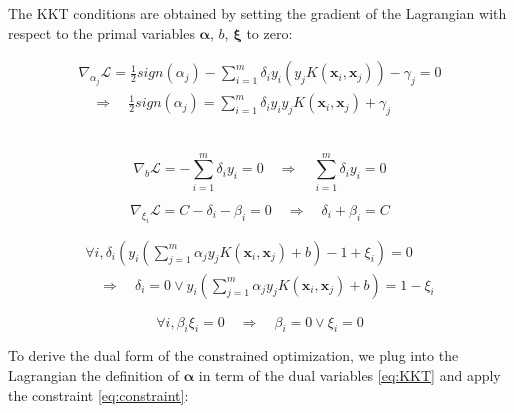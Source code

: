\documentclass{article}
\begin{document}
The KKT conditions are obtained by setting the gradient of the Lagrangian with respect to the primal variables $\bm{\alpha}$, $b$, $\bm{\xi}$ to zero:

\begin{equation}
    \begin{aligned}
        \nabla_{\alpha_{j}} \mathcal{L} =
        \frac{1}{2} sign(\alpha_{j})
        -
        \sum_{i=1}^{m}
        \delta_{i}
        y_{i}
        \left(
            y_{j} K\left(\boldsymbol{x}_{i}, \boldsymbol{x}_{j}\right)
        \right) 
        - \gamma_{j}
        = 0 \\
        \quad \Longrightarrow \quad
        \frac{1}{2} sign(\alpha_{j}) =
        \sum_{i=1}^{m}
        \delta_{i}
        y_{i}
            y_{j} K\left(\boldsymbol{x}_{i}, \boldsymbol{x}_{j}\right)
        + \gamma_{j}
    \end{aligned}
    \label{eq:KKT}
\end{equation}\

\begin{equation}
    \nabla_{b} \mathcal{L}=
    -\sum_{i=1}^{m} \delta_{i} y_{i}=0
    \quad \Longrightarrow \quad \sum_{i=1}^{m} \delta_{i} y_{i}=0
\end{equation}

\begin{equation}
    \nabla_{\xi_{i}} \mathcal{L}=C-\delta_{i}-\beta_{i}=0 \quad \Longrightarrow \quad \delta_{i}+\beta_{i}=C
\end{equation}

\begin{equation}
    \begin{aligned}
        \forall i, \delta_{i}
        \left(
        y_{i}\left(\sum_{j=1}^{m} \alpha_{j} y_{j} K\left(\boldsymbol{x}_{i}, \boldsymbol{x}_{j}\right)+b\right) - 1 + \xi_{i}
        \right)
        = 0 \\
        \quad \Longrightarrow \quad
        \delta_{i}=0
        \vee
        y_{i}\left(\sum_{j=1}^{m} \alpha_{j} y_{j} K\left(\boldsymbol{x}_{i}, \boldsymbol{x}_{j}\right)+b\right) = 1 - \xi_{i}
    \end{aligned}
    \label{eq:constraint}
\end{equation}


\begin{equation}
    \forall i, \beta_{i} \xi_{i}=0 \quad \Longrightarrow \quad \beta_{i}=0 \vee \xi_{i}=0
\end{equation}

To derive the dual form of the constrained optimization, we plug into the Lagrangian the definition of $\bm{\alpha}$ in term of the dual variables \eqref{eq:KKT} and apply the constraint \eqref{eq:constraint}:
\end{document}
